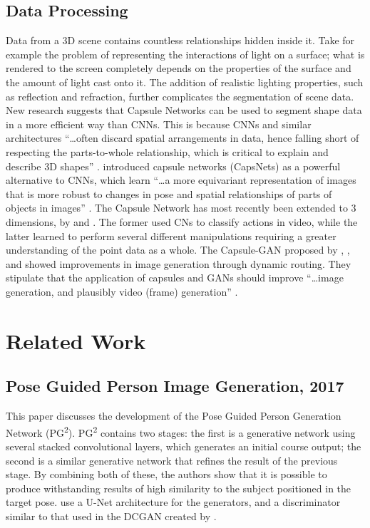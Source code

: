 \documentclass{article}
\begin{document}
\subsection{Data Processing}
\label{subsec:data_processing}
Data from a 3D scene contains countless relationships hidden inside it.
Take for example the problem of representing the
interactions of light on a surface;
what is rendered to the screen completely depends on
the properties of the surface and the amount of light cast onto it.
The addition of realistic lighting properties, such as reflection and refraction,
further complicates the segmentation of scene data.
New research suggests that
Capsule Networks can be used to segment shape data in a
more efficient way than CNNs. This is because CNNs and similar architectures
``\dots often discard
spatial arrangements in data, hence falling short of respecting
the parts-to-whole relationship, which is critical to explain
and describe 3D shapes'' \cite{3D_capsule_networks}.
\cite{dynamic_routing} introduced capsule networks (CapsNets) as a powerful
alternative to CNNs, which learn ``\dots a more equivariant representation of 
images that is more robust to changes in pose and spatial relationships of parts of objects in images'' \cite{transforming_auto_encoders}.
The Capsule Network has most recently been extended to 3 dimensions, by
\cite{video_capsule} and \cite{3D_capsule_networks}.
The former used CNs to classify actions in video,
while the latter learned to perform several different manipulations
requiring a greater understanding of the point data as a whole.
The Capsule-GAN proposed by \cite{capsule_synthesis}, \cite{capsgan},
and \cite{capsule_gan}
showed improvements in image generation through dynamic routing.
They stipulate that the application of capsules and GANs should improve
``\dots image generation, and plausibly video (frame) generation''
\cite{capsgan}.

\section{Related Work}
\label{sec:related}

\subsection*{Pose Guided Person Image Generation, 2017}
\nocite{pose_guided_image_generation}
This paper discusses the development of the Pose Guided Person Generation
Network (PG\textsuperscript{2}). PG\textsuperscript{2} contains two stages:
the first is a generative network using several stacked convolutional layers,
which generates an initial course output;
the second is a similar generative network that refines the
result of the previous stage. By combining both of these,
the authors show that it is possible to produce withstanding results of
high similarity to the subject positioned in the target pose.
\cite{pose_guided_image_generation} use a U-Net architecture for the generators, 
and a discriminator
similar to that used in the DCGAN created by
\cite{unsupervised_learning}.
\end{document}
